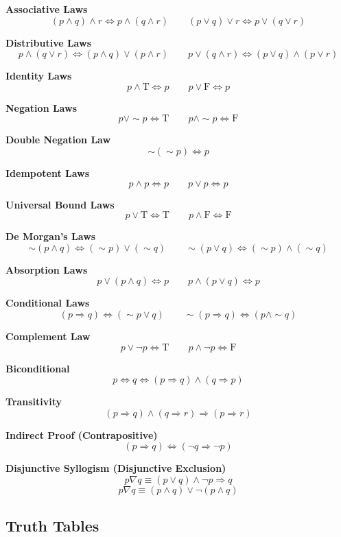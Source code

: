 \textbf{Associative Laws}
\[
	(p \land q) \land r \Leftrightarrow p \land (q \land r) \qquad (p \lor q) \lor r \Leftrightarrow p \lor (q \lor r)
\]

\textbf{Distributive Laws}
\[
	p \land (q \lor r) \Leftrightarrow (p \land q) \lor (p \land r) \qquad
	p \lor (q \land r) \Leftrightarrow (p \lor q) \land (p \lor r)
\]

\textbf{Identity Laws}
\[
	p \land \text{T} \Leftrightarrow p \qquad p \lor \text{F} \Leftrightarrow p
\]

\textbf{Negation Laws}
\[
	p \lor \sim p \Leftrightarrow \text{T} \qquad p \land \sim p \Leftrightarrow \text{F}
\]

\textbf{Double Negation Law}
\[
	\sim(\sim p) \Leftrightarrow p
\]

\textbf{Idempotent Laws}
\[
	p \land p \Leftrightarrow p \qquad p \lor p \Leftrightarrow p
\]

\textbf{Universal Bound Laws}
\[
	p \lor \text{T} \Leftrightarrow \text{T} \qquad p \land \text{F} \Leftrightarrow \text{F}
\]

\textbf{De Morgan’s Laws}
\[
	\sim (p \land q) \Leftrightarrow (\sim p) \lor (\sim q) \qquad
	\sim (p \lor q) \Leftrightarrow (\sim p) \land (\sim q)
\]

\textbf{Absorption Laws}
\[
	p \lor (p \land q) \Leftrightarrow p \qquad p \land (p \lor q) \Leftrightarrow p
\]

\textbf{Conditional Laws}
\[
	(p \Rightarrow q) \Leftrightarrow (\sim p \lor q) \qquad \sim(p \Rightarrow q) \Leftrightarrow (p \land \sim q)
\]

\textbf{Complement Law}
\[
	p \lor \neg p \Leftrightarrow \text{T} \qquad p \land \neg p \Leftrightarrow \text{F}
\]

\textbf{Biconditional}
\[
	p \Leftrightarrow q \Leftrightarrow (p \Rightarrow q) \land (q \Rightarrow p)
\]

\textbf{Transitivity}
\[
	(p \Rightarrow q) \land (q \Rightarrow r) \Rightarrow (p \Rightarrow r)
\]

\textbf{Indirect Proof (Contrapositive)}
\[
	(p \Rightarrow q) \Leftrightarrow (\neg q \Rightarrow \neg p)
\]

\textbf{Disjunctive Syllogism (Disjunctive Exclusion)}
\[
	p \nabla q \equiv (p \lor q) \land \neg p \Rightarrow q
\]
\[
	p \nabla q \equiv(p \land q) \lor \neg  (p \land q)
\]

\subsection{Truth Tables}

